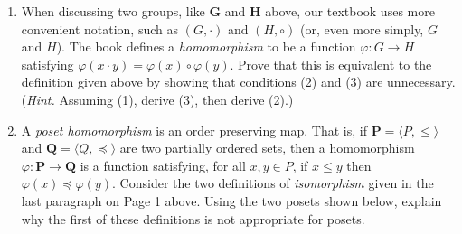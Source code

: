 \documentclass[12pt,reqno]{amsart}
\newcommand{\bL}{\ensuremath{\mathbf{L}}}
\newcommand{\bP}{\ensuremath{\mathbf{P}}}
\newcommand{\bQ}{\ensuremath{\mathbf{Q}}}
\newcommand{\bG}{\ensuremath{\mathbf{G}}}
\newcommand{\bH}{\ensuremath{\mathbf{H}}}
\newcommand{\meet}{\ensuremath{\wedge}}
\newcommand{\<}{\ensuremath{\langle}}
\renewcommand{\>}{\ensuremath{\rangle}}
\newcommand{\join}{\ensuremath{\vee}}
\begin{document}
\begin{enumerate}[{\bf 1.}]
\item When discussing two groups, like $\bG$ and $\bH$ above,
  our textbook uses more convenient notation, such as 
  $(G, \cdot)$ and $(H, \circ)$ (or, even more simply, $G$ and $H$).  The book
  defines a \emph{homomorphism} to be a function $\varphi: G\rightarrow H$ satisfying
  $\varphi(x\cdot y) = \varphi(x) \circ \varphi(y)$.
  Prove that this is equivalent to the definition given above by showing that 
  conditions (2) and (3) are unnecessary.\\
  ({\it Hint.} Assuming (1), derive (3), then derive (2).)

\vfill

% 

\item
A \emph{poset homomorphism} is an order preserving map.  That is, if
$\bP = \<P, \leqslant\>$ and 
$\bQ = \<Q, \preccurlyeq\>$ are two partially 
ordered sets, then a homomorphism 
$\varphi: \bP \rightarrow \bQ$  is a function satisfying, for all $x, y\in P$, 
if $x \leqslant y$ then $\varphi(x)\preccurlyeq \varphi(y)$.
Consider the two definitions of \emph{isomorphism} given in the last paragraph
on Page 1 above.
Using the two posets shown below, explain why the first of these definitions is 
not appropriate for posets.

\vskip5mm

\begin{center}
\hskip3cm
\end{center}


\end{enumerate}
\end{document}
